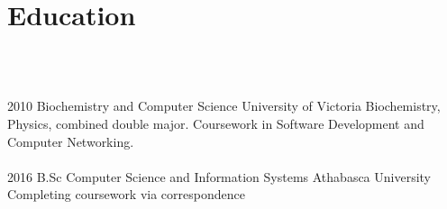 \documentclass[]{vella-cv}
\begin{document}
\section{Education}
\\\\
\begin{entrylist}
  \entry
    {2010}
    {Biochemistry and Computer Science}
    {University of Victoria}
    {Biochemistry, Physics, combined double major. Coursework in Software Development and Computer Networking.\\\\}
    \entry
    {2016}
    {B.Sc Computer Science and Information Systems}
    {Athabasca University}
    {Completing coursework via correspondence}
\end{entrylist}

\newpage
\end{document}
